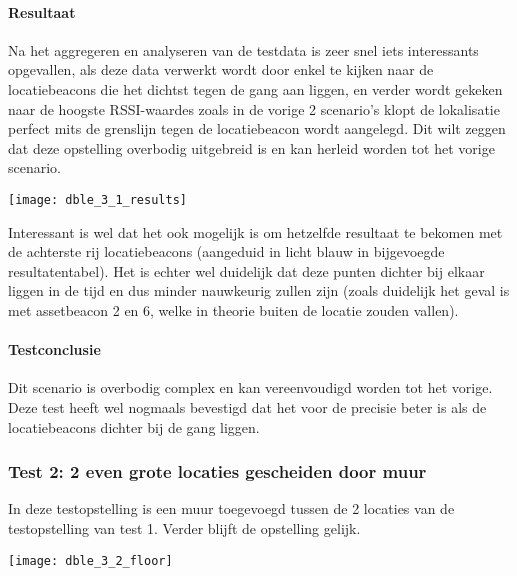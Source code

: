 \paragraph{Resultaat}
\begin{minipage}{0.42\textwidth}
Na het aggregeren en analyseren van de testdata is zeer snel iets interessants opgevallen, als deze data verwerkt wordt door enkel te kijken naar de locatiebeacons die het dichtst tegen de gang aan liggen, en verder wordt gekeken naar de hoogste RSSI-waardes zoals in de vorige 2 scenario's klopt de lokalisatie perfect mits de grenslijn tegen de locatiebeacon wordt aangelegd. Dit wilt zeggen dat deze opstelling overbodig uitgebreid is en kan herleid worden tot het vorige scenario. 
\end{minipage}
\hfill
\begin{minipage}{0.55\textwidth}
	\texttt{[image: dble\_3\_1\_results]}
	\label{fig:ond-ble-dynamic-3-1-res}
\end{minipage}

Interessant is wel dat het ook mogelijk is om hetzelfde resultaat te bekomen met de achterste rij locatiebeacons (aangeduid in licht blauw in bijgevoegde resultatentabel). Het is echter wel duidelijk dat deze punten dichter bij elkaar liggen in de tijd en dus minder nauwkeurig zullen zijn (zoals duidelijk het geval is met assetbeacon 2 en 6, welke in theorie buiten de locatie zouden vallen).

\paragraph{Testconclusie}
Dit scenario is overbodig complex en kan vereenvoudigd worden tot het vorige. Deze test heeft wel nogmaals bevestigd dat het voor de precisie beter is als de locatiebeacons dichter bij de gang liggen.

\subsubsection{Test 2: 2 even grote locaties gescheiden door muur}
\begin{minipage}{0.55\textwidth}
In deze testopstelling is een muur toegevoegd tussen de 2 locaties van de testopstelling van test 1. Verder blijft de opstelling gelijk.
\end{minipage}
\hfill
\begin{minipage}{0.42\textwidth}
	\texttt{[image: dble\_3\_2\_floor]}
	\label{fig:ond-ble-dynamic-3-2-ops}
\end{minipage}

